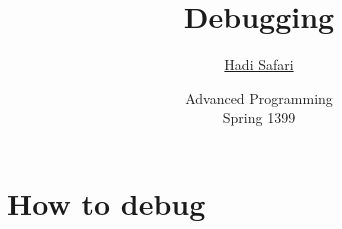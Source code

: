 \documentclass[xcolor={dvipsnames}]{beamer}
\title{Debugging}
\author{\href{mailto:hadi.safari@ut.ac.ir?subject=[AP\%20S98]\%20}{Hadi Safari}}
\institute[University of Tehran]{
    \texttt{[image: ut]}\\
    University of Tehran
}
\date[Advanced Programming (S99)]{
    Advanced Programming\\
    \small Spring 1399\\
}
\begin{document}
\frame{\titlepage}



\section{How to debug}



\end{document}
